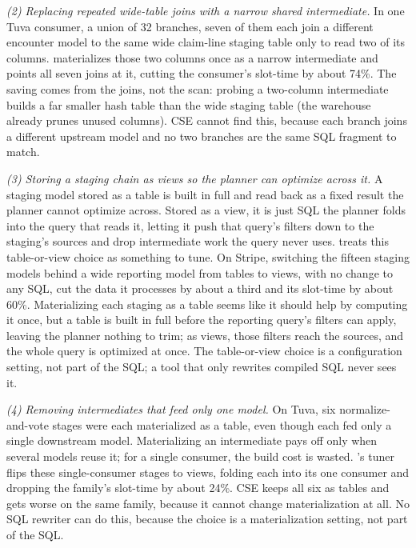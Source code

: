 \emph{(2) Replacing repeated wide-table joins with a narrow shared intermediate.} In one Tuva consumer, a union of 32 branches, seven of them each join a different encounter model to the same wide claim-line staging table only to read two of its columns. \dagsmith{} materializes those two columns once as a narrow intermediate and points all seven joins at it, cutting the consumer's slot-time by about 74\%. The saving comes from the joins, not the scan: probing a two-column intermediate builds a far smaller hash table than the wide staging table (the warehouse already prunes unused columns). CSE cannot find this, because each branch joins a different upstream model and no two branches are the same SQL fragment to match.

\emph{(3) Storing a staging chain as views so the planner can optimize across it.} A staging model stored as a table is built in full and read back as a fixed result the planner cannot optimize across. Stored as a view, it is just SQL the planner folds into the query that reads it, letting it push that query's filters down to the staging's sources and drop intermediate work the query never uses. \dagsmith{} treats this table-or-view choice as something to tune. On Stripe, switching the fifteen staging models behind a wide reporting model from tables to views, with no change to any SQL, cut the data it processes by about a third and its slot-time by about 60\%. Materializing each staging as a table seems like it should help by computing it once, but a table is built in full before the reporting query's filters can apply, leaving the planner nothing to trim; as views, those filters reach the sources, and the whole query is optimized at once. The table-or-view choice is a configuration setting, not part of the SQL; a tool that only rewrites compiled SQL never sees it.






\emph{(4) Removing intermediates that feed only one model.} On Tuva, six normalize-and-vote stages were each materialized as a table, even though each fed only a single downstream model. Materializing an intermediate pays off only when several models reuse it; for a single consumer, the build cost is wasted. \dagsmith{}'s tuner flips these single-consumer stages to views, folding each into its one consumer and dropping the family's slot-time by about 24\%.  CSE keeps all six as tables and gets worse on the same family, because it cannot change materialization at all. No SQL rewriter can do this, because the choice is a materialization setting, not part of the SQL.

